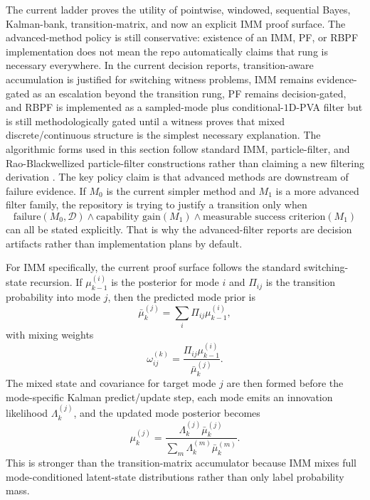 \documentclass[11pt]{article}
\begin{document}
\noindent
The current ladder proves the utility of pointwise, windowed, sequential Bayes, Kalman-bank, transition-matrix, and now an explicit IMM proof surface. The advanced-method policy is still conservative: existence of an IMM, PF, or RBPF implementation does not mean the repo automatically claims that rung is necessary everywhere. In the current decision reports, transition-aware accumulation is justified for switching witness problems, IMM remains evidence-gated as an escalation beyond the transition rung, PF remains decision-gated, and RBPF is implemented as a sampled-mode plus conditional-\(1\text{D}\)-PVA filter but is still methodologically gated until a witness proves that mixed discrete/continuous structure is the simplest necessary explanation. The algorithmic forms used in this section follow standard IMM, particle-filter, and Rao-Blackwellized particle-filter constructions rather than claiming a new filtering derivation \cite{barshalom2001,gordon1993,doucet2001}.
The key policy claim is that advanced methods are downstream of failure evidence. If \(M_0\) is the current simpler method and \(M_1\) is a more advanced filter family, the repository is trying to justify a transition only when
\begin{equation}
\text{failure}(M_0, \mathcal{D}) \land \text{capability gain}(M_1) \land \text{measurable success criterion}(M_1)
\end{equation}
can all be stated explicitly. That is why the advanced-filter reports are decision artifacts rather than implementation plans by default.

For IMM specifically, the current proof surface follows the standard
switching-state recursion. If \(\mu_{k-1}^{(i)}\) is the posterior for mode
\(i\) and \(\Pi_{ij}\) is the transition probability into mode \(j\), then the
predicted mode prior is
\begin{equation}
\bar{\mu}_{k}^{(j)}
=
\sum_i \Pi_{ij}\mu_{k-1}^{(i)},
\end{equation}
with mixing weights
\begin{equation}
\omega_{ij}^{(k)}
=
\frac{\Pi_{ij}\mu_{k-1}^{(i)}}{\bar{\mu}_{k}^{(j)}}.
\end{equation}
The mixed state and covariance for target mode \(j\) are then formed before the
mode-specific Kalman predict/update step, each mode emits an innovation
likelihood \(\Lambda_k^{(j)}\), and the updated mode posterior becomes
\begin{equation}
\mu_k^{(j)}
=
\frac{\Lambda_k^{(j)}\bar{\mu}_k^{(j)}}{\sum_m \Lambda_k^{(m)}\bar{\mu}_k^{(m)}}.
\end{equation}
This is stronger than the transition-matrix accumulator because IMM mixes full
mode-conditioned latent-state distributions rather than only label probability
mass.
\end{document}
